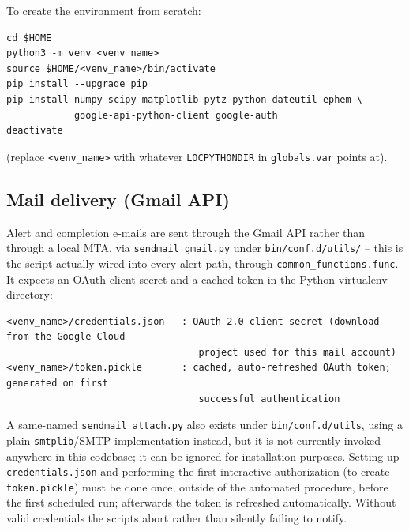 To create the environment from scratch:
\begin{lstlisting}
cd $HOME
python3 -m venv <venv_name>
source $HOME/<venv_name>/bin/activate
pip install --upgrade pip
pip install numpy scipy matplotlib pytz python-dateutil ephem \
            google-api-python-client google-auth
deactivate
\end{lstlisting}
(replace \texttt{<venv\_name>} with whatever \texttt{LOCPYTHONDIR} in \texttt{globals.var} points at).

\subsection{Mail delivery (Gmail API)}
Alert and completion e-mails are sent through the Gmail API rather than through a local MTA, via
\texttt{sendmail\_gmail.py} under \texttt{bin/conf.d/utils/} -- this is the script actually wired into
every alert path, through \texttt{common\_functions.func}. It expects an OAuth client secret and a
cached token in the Python virtualenv directory:
\begin{lstlisting}
<venv_name>/credentials.json   : OAuth 2.0 client secret (download from the Google Cloud
                                  project used for this mail account)
<venv_name>/token.pickle       : cached, auto-refreshed OAuth token; generated on first
                                  successful authentication
\end{lstlisting}
A same-named \texttt{sendmail\_attach.py} also exists under \texttt{bin/conf.d/utils}, using a plain
\texttt{smtplib}\slash SMTP implementation instead, but it is not currently invoked anywhere in this
codebase; it can be ignored for installation purposes.
Setting up \texttt{credentials.json} and performing the first interactive authorization (to create
\texttt{token.pickle}) must be done once, outside of the automated procedure, before the first scheduled
run; afterwards the token is refreshed automatically. Without valid credentials the scripts abort rather
than silently failing to notify.

